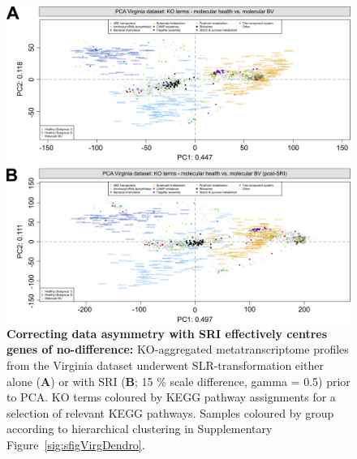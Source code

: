 \documentclass[sn-mathphys,Numbered]{sn-jnl}%
\begin{document}
\begin{figure}[H]
    \centering
    \includegraphics[scale = 0.95]{0_supplFig6.png}
    \caption{\textbf{Correcting data asymmetry with SRI effectively centres genes of no-difference:} KO-aggregated metatranscriptome profiles from the Virginia dataset underwent SLR-transformation either alone (\textbf{A}) or with SRI (\textbf{B}; 15 \% scale difference, gamma = 0.5) prior to PCA. KO terms coloured by KEGG pathway assignments for a selection of relevant KEGG pathways. Samples coloured by group according to hierarchical clustering in Supplementary Figure~\ref{sig:sfigVirgDendro}.} \label{fig:sfigVirgKOcent}
\end{figure}
\newpage
\end{document}
